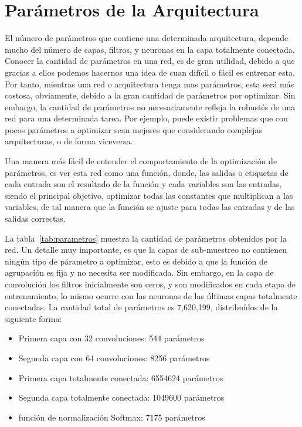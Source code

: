 \section{Parámetros de la Arquitectura}

El número de parámetros que contiene una determinada arquitectura, depende mucho del número de capas, filtros, y neuronas en la capa totalmente conectada. Conocer la cantidad de parámetros en una red, es de gran utilidad, debido a que gracias a ellos podemos hacernos una idea de cuan difícil o fácil es entrenar esta. Por tanto, mientras una red o arquitectura tenga mas parámetros, esta será más costosa, obviamente, debido a la gran cantidad de parámetros por optimizar. Sin embargo, la cantidad de parámetros no necesariamente refleja la robustés de una red para una determinada tarea. Por ejemplo, puede existir problemas que con pocos parámetros a optimizar sean mejores que considerando complejas arquitecturas, o de forma viceversa.

Una manera más fácil de entender el comportamiento de la optimización de parámetros, es ver esta red como una función, donde, las salidas o etiquetas de cada entrada son el resultado de la función y cada variables son las entradas, siendo el principal objetivo, optimizar todas las constantes que multiplican a las variables, de tal manera que la función se ajuste para todas las entradas y de las salidas correctas. 

La tabla~\ref{tab:parametros} muestra la cantidad de parámetros obtenidos por la red. Un detalle muy importante, es que la capas de sub-muestreo no contienen ningún tipo de párametro a optimizar, esto es debido a que la función de agrupación es fija y no necesita ser modificada. Sin embargo, en la capa de convolución los filtros inicialmente son ceros, y son modificados en cada etapa de entrenamiento, lo mismo ocurre con las neuronas de las últimas capas totalmente conectadas. La cantidad total de parámetros es 7,620,199, distribuídos de la siguiente forma: 

\begin{itemize}
\item Primera capa con 32 convoluciones: 544 parámetros
\item Segunda capa con 64 convoluciones: 8256 parámetros
\item Primera capa totalmente conectada: 6554624 parámetros
\item Segunda capa totalmente conectada: 1049600 parámetros
\item función de normalización Softmax: 7175 parámetros
\end{itemize}


